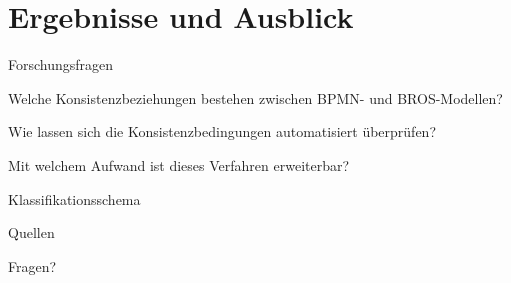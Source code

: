 \section{Ergebnisse und Ausblick}

\begin{frame}{Forschungsfragen}
  \begin{description}[4cm]
    \item[F1] Welche Konsistenzbeziehungen bestehen zwischen BPMN- und BROS-Modellen?

    \item[F2] Wie lassen sich die Konsistenzbedingungen automatisiert überprüfen?

    \item[F3] Mit welchem Aufwand ist dieses Verfahren erweiterbar?
  \end{description}
\end{frame}

\begin{frame}{Klassifikationsschema}
  
\end{frame}

\begin{frame}[allowframebreaks]{Quellen}
  \printbibliography[heading=none]
\end{frame}

\begin{frame}[standout]
  Fragen?
\end{frame}
